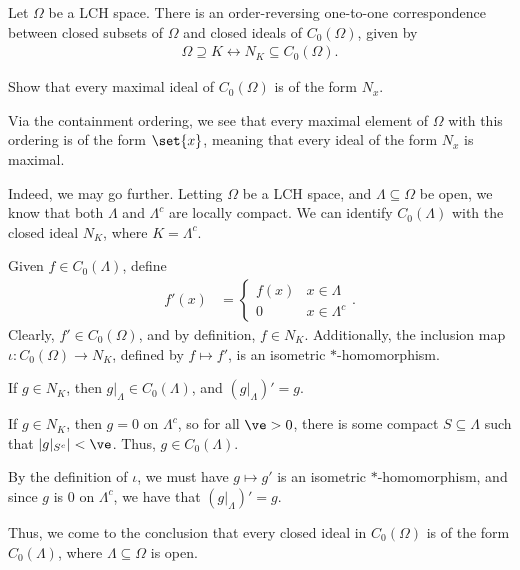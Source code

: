 \documentclass[10pt]{mypackage}
\begin{document}
\begin{corollary}
  Let $\Omega$ be a LCH space. There is an order-reversing one-to-one correspondence between closed subsets of $\Omega$ and closed ideals of $C_0\left(\Omega\right)$, given by
  \begin{align*}
    \Omega\supseteq K\leftrightarrow N_K\subseteq C_0\left(\Omega\right).
  \end{align*}
\end{corollary}
\begin{exercise}
  Show that every maximal ideal of $C_0\left(\Omega\right)$ is of the form $N_x$.
\end{exercise}
\begin{solution}
  Via the containment ordering, we see that every maximal element of $\Omega$ with this ordering is of the form $\set{x}$, meaning that every ideal of the form $N_x$ is maximal.
\end{solution}
Indeed, we may go further. Letting $\Omega$ be a LCH space, and $\Lambda\subseteq \Omega$ be open, we know that both $\Lambda$ and $\Lambda^{c}$ are locally compact. We can identify $C_0\left(\Lambda\right)$ with the closed ideal $N_K$, where $K = \Lambda^{c}$.\newline

Given $f\in C_0\left(\Lambda\right)$, define
\begin{align*}
  f'(x) &= \begin{cases}
    f(x) & x\in \Lambda\\
    0 & x\in \Lambda^{c}
  \end{cases}.
\end{align*}
Clearly, $f'\in C_0\left(\Omega\right)$, and by definition, $f\in N_K$. Additionally, the inclusion map $\iota\colon C_0\left(\Omega\right)\rightarrow N_K$, defined by $f\mapsto f'$, is an isometric $\ast$-homomorphism.
\begin{exercise}
  If $g\in N_K$, then $g|_{\Lambda} \in C_0\left(\Lambda\right)$, and $\left(g|_{\Lambda}\right)' = g$.
\end{exercise}
\begin{solution}
  If $g\in N_K$, then $g = 0$ on $\Lambda^{c}$, so for all $\ve > 0$, there is some compact $S\subseteq \Lambda$ such that $\left\vert g|_{S^{c}} \right\vert < \ve$. Thus, $g\in C_0\left(\Lambda\right)$.\newline

  By the definition of $\iota$, we must have $g \mapsto g'$ is an isometric $\ast$-homomorphism, and since $g$ is $0$ on $\Lambda^{c}$, we have that $\left(g|_{\Lambda}\right)' = g$.
\end{solution}
Thus, we come to the conclusion that every closed ideal in $C_0\left(\Omega\right)$ is of the form $C_0\left(\Lambda\right)$, where $\Lambda\subseteq \Omega$ is open.
\end{document}
